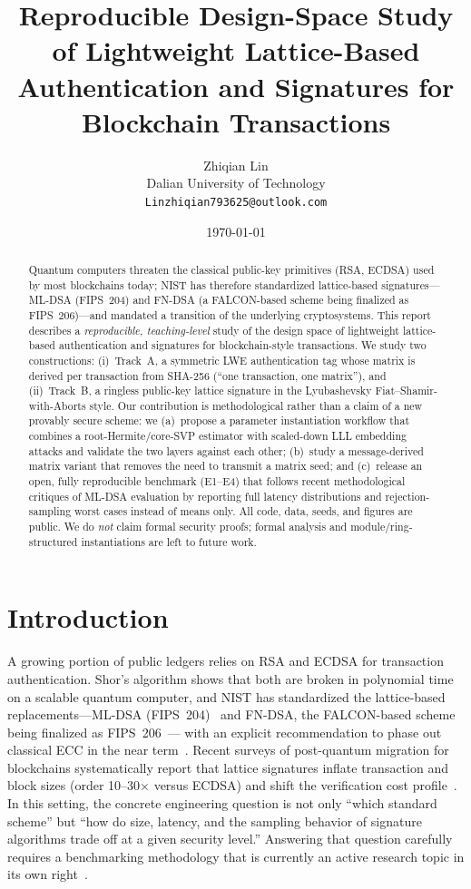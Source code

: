\documentclass[11pt]{article}
\title{Reproducible Design-Space Study of Lightweight Lattice-Based\\ Authentication and Signatures for Blockchain Transactions}
\author{Zhiqian Lin\\ \small Dalian University of Technology\\ \small \texttt{Linzhiqian793625@outlook.com}}
\date{\today}
\begin{document}
\maketitle

\begin{abstract}
Quantum computers threaten the classical public-key primitives (RSA, ECDSA) used
by most blockchains today; NIST has therefore standardized lattice-based signatures---ML-DSA (FIPS~204) and
FN-DSA (a FALCON-based scheme being finalized as FIPS~206)---and mandated a transition of the
underlying cryptosystems.  This report describes a \emph{reproducible,
teaching-level} study of the design space of lightweight lattice-based
authentication and signatures for blockchain-style transactions.  We study two
constructions: (i)~Track~A, a symmetric LWE authentication tag whose matrix is
derived per transaction from SHA-256 (``one transaction, one matrix''), and
(ii)~Track~B, a ringless public-key lattice signature in the Lyubashevsky
Fiat--Shamir-with-Aborts style.  Our contribution is methodological rather than
a claim of a new provably secure scheme: we (a)~propose a parameter
instantiation workflow that combines a root-Hermite/core-SVP estimator with
scaled-down LLL embedding attacks and validate the two layers against each
other; (b)~study a message-derived matrix variant that removes the need to
transmit a matrix seed; and (c)~release an open, fully reproducible benchmark
(E1--E4) that follows recent methodological critiques of ML-DSA evaluation by
reporting full latency distributions and rejection-sampling worst cases instead
of means only.  All code, data, seeds, and figures are public.  We do
\emph{not} claim formal security proofs; formal analysis and
module/ring-structured instantiations are left to future work.
\end{abstract}

\section{Introduction}\label{sec:intro}

A growing portion of public ledgers relies on RSA and ECDSA for transaction
authentication.  Shor's algorithm shows that both are broken in polynomial time
on a scalable quantum computer, and NIST has standardized the lattice-based
replacements---ML-DSA (FIPS~204)~\cite{fips204} and FN-DSA, the FALCON-based
  scheme being finalized as FIPS~206~\cite{falcon2020}---
with an explicit recommendation to phase out classical ECC in the near
term~\cite{fips204}.  Recent surveys of post-quantum migration for blockchains
systematically report that lattice signatures inflate transaction and block
sizes (order 10--30$\times$ versus ECDSA) and shift the verification cost
profile~\cite{survey-pq-blockchain-2025,pq-transition-2026}.  In this setting,
the concrete engineering question is not only ``which standard scheme'' but
``how do size, latency, and the sampling behavior of signature algorithms trade
off at a given security level.''  Answering that question carefully requires a
benchmarking methodology that is currently an active research topic in its own
right~\cite{mldsa-bench-2026}.
\end{document}
